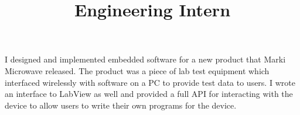 \title{\textbf{Engineering Intern}}
\begin{position}
I designed and implemented embedded software for a new product that
Marki Microwave released. The product was a piece of lab test equipment
which interfaced wirelessly with software on a PC to provide test data
to users. I wrote an interface to LabView as well and provided a full
API for interacting with the device to allow users to write their own
programs for the device.
\end{position}

